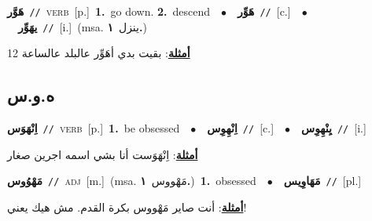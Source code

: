 \documentclass[10pt,a4paper,twoside]{article} %
\begin{document}
\begin{multicols}{2}
{\setlength\topsep{0pt}\textbf{\foreignlanguage{arabic}{هَوَّر}}\ {\color{gray}\texttt{//}\color{black}}\ \textsc{verb}\ [p.]\ \textbf{1.}~go down.  \textbf{2.}~descend\ \ $\bullet$\ \ \setlength\topsep{0pt}\textbf{\foreignlanguage{arabic}{هَوِّر}}\ {\color{gray}\texttt{//}\color{black}}\ [c.]\ \ $\bullet$\ \ \setlength\topsep{0pt}\textbf{\foreignlanguage{arabic}{يهَوِّر}}\ {\color{gray}\texttt{//}\color{black}}\ [i.]\ \color{gray}(msa. \foreignlanguage{arabic}{ينزل}~\foreignlanguage{arabic}{\textbf{١.}})\color{black}\  \begin{flushright}\color{gray}\foreignlanguage{arabic}{\textbf{\underline{\foreignlanguage{arabic}{أمثلة}}}: بقيت بدي أهَوِّر عالبلد عالساعة 12}\end{flushright}\color{black}} \vspace{2mm}

\vspace{-3mm}
\subsection*{\color{blue}\foreignlanguage{arabic}{ه.و.س}\color{blue}{}} 

{\setlength\topsep{0pt}\textbf{\foreignlanguage{arabic}{اِنْهَوَس}}\ {\color{gray}\texttt{//}\color{black}}\ \textsc{verb}\ [p.]\ \textbf{1.}~be obsessed\ \ $\bullet$\ \ \setlength\topsep{0pt}\textbf{\foreignlanguage{arabic}{اِنْهِوِس}}\ {\color{gray}\texttt{//}\color{black}}\ [c.]\ \ $\bullet$\ \ \setlength\topsep{0pt}\textbf{\foreignlanguage{arabic}{يِنْهِوِس}}\ {\color{gray}\texttt{//}\color{black}}\ [i.]\  \begin{flushright}\color{gray}\foreignlanguage{arabic}{\textbf{\underline{\foreignlanguage{arabic}{أمثلة}}}: اِنْهَوَست أنا بشي اسمه اجرين صغار}\end{flushright}\color{black}} \vspace{2mm}

{\setlength\topsep{0pt}\textbf{\foreignlanguage{arabic}{مَهْوُوس}}\ {\color{gray}\texttt{//}\color{black}}\ \textsc{adj}\ [m.]\ \color{gray}(msa. \foreignlanguage{arabic}{مَهْووس}~\foreignlanguage{arabic}{\textbf{١.}})\color{black}\ \textbf{1.}~obsessed\ \ $\bullet$\ \ \setlength\topsep{0pt}\textbf{\foreignlanguage{arabic}{مَهَاوِيس}}\ {\color{gray}\texttt{//}\color{black}}\ [pl.]\  \begin{flushright}\color{gray}\foreignlanguage{arabic}{\textbf{\underline{\foreignlanguage{arabic}{أمثلة}}}: أنت صاير مَهْووس بكرة القدم. مش هيك يعني!}\end{flushright}\color{black}} \vspace{2mm}


\end{multicols}
\end{document}
